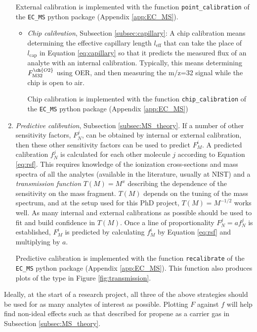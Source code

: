 \begin{enumerate}
External calibration is implemented with the function \texttt{point\_calibration} of the \texttt{EC\_MS} python package (Appendix \ref{app:EC_MS}).
\begin{itemize}
	\item \textit{Chip calibration}, Subsection \ref{subsec:capillary}: A chip calibration means determining the effective capillary length $l_\text{eff}$ that can take the place of $l_\text{cap}$ in Equation \ref{eq:capillary} so that it predicts the measured flux of an analyte with an internal calibration. Typically, this means determining $F_\text{M32}^{\ch{O2}}$ using OER, and then measuring the m/z=32 signal while the chip is open to air.
	
	Chip calibration is implemented with the function \texttt{chip\_calibration} of the \texttt{EC\_MS} python package (Appendix \ref{app:EC_MS})
\end{itemize}
\item 
\textit{Predictive calibration}, Subsection \ref{subsec:MS_theory}. If a number of other sensitivity factors, $F_{N}^{j}$, can be obtained by internal or external calibration, then these other sensitivity factors can be used to predict $F_M^i$. A predicted calibration $f_N^j$ is calculated for each other molecule $j$ according to Equation \ref{eq:rsf}. This requires knowledge of the ionization cross-sections and mass spectra of all the analytes (available in the literature, usually at NIST\cite{NIST}) and a \textit{transmission function} $T(M)=M^x$ describing the dependence of the sensitivity on the mass fragment. $T(M)$ depends on the tuning of the mass spectrum, and at the setup used for this PhD project, $T(M)=M^{-1/2}$ works well. As many internal and external calibrations as possible should be used to fit and build confidence in $T(M)$. Once a line of proportionality $F_N^j = a f_N^j$ is established, $F_M^i$ is predicted by calculating $f_M^i$ by Equation \ref{eq:rsf} and multiplying by $a$. 

Predictive calibration is implemented with the function \texttt{recalibrate} of the \texttt{EC\_MS} python package (Appendix \ref{app:EC_MS}). This function also produces plots of the type in Figure \ref{fig:transmission}. 

\end{enumerate}

Ideally, at the start of a research project, all three of the above strategies should be used for as many analytes of interest as possible. Plotting $F$ against $f$ will help find non-ideal effects such as that described for propene as a carrier gas in Subsection \ref{subsec:MS_theory}.

